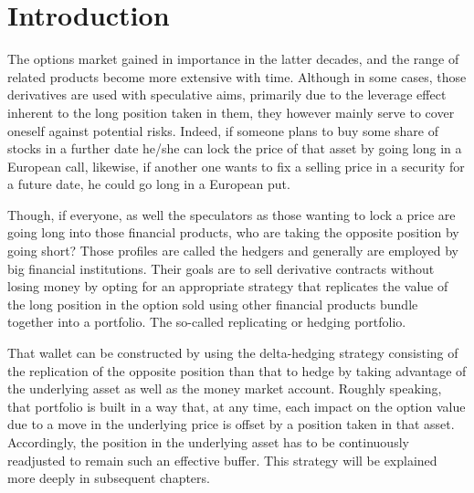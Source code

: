 \documentclass[12pt]{report}
\begin{document}


{
\tableofcontents

\listoffigures
 
\listoftables}



%
%
\chapter{Introduction}
\label{cha:Introduction}

The options market gained in importance in the latter decades, and the range of related products become more extensive with time.
Although in some cases, those derivatives are used with speculative aims, primarily due to the leverage effect inherent to the long position taken in them, they however mainly serve to cover oneself against potential risks.
Indeed, if someone plans to buy some share of stocks in a further date he/she can lock the price of that asset by going long in a European call, likewise, if another one wants to fix a selling price in a security for a future date, he could go long in a European put.

Though, if everyone, as well the speculators as those wanting to lock a price are going long into those financial products, who are taking the opposite position by going short?
Those profiles are called the hedgers and generally are employed by big financial institutions.
Their goals are to sell derivative contracts without losing money by opting for an appropriate strategy that replicates the value of the long position in the option sold using other financial products bundle together into a portfolio. The so-called replicating or hedging portfolio.

That wallet can be constructed by using the delta-hedging strategy consisting of the replication of the opposite position than that to hedge by taking advantage of the underlying asset as well as the money market account.
Roughly speaking, that portfolio is built in a way that, at any time, each impact on the option value due to a move in the underlying price is offset by a position taken in that asset.
Accordingly, the position in the underlying asset has to be continuously readjusted to remain such an effective buffer.
This strategy will be explained more deeply in subsequent chapters.
\end{document}
